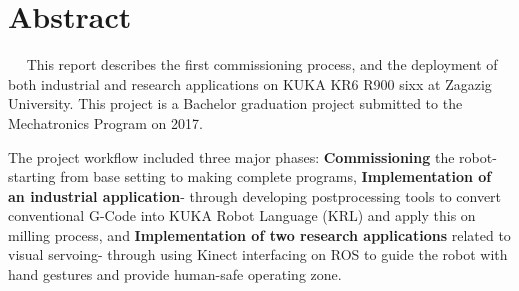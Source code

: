 \chapter*{Abstract}\label{ch:abstract}
%
%
\setlength{\parindent}{1em}
  
This report describes the first commissioning process, and the deployment of both industrial and research applications on KUKA KR6 R900 sixx at Zagazig University. This project is a Bachelor graduation project submitted to the Mechatronics Program on 2017.%

The project workflow included three major phases: \textbf{Commissioning} the robot- starting from base setting to making complete programs,  \textbf{Implementation of an industrial application}- through developing postprocessing tools to convert conventional G-Code into KUKA Robot Language (KRL) and apply this on milling process, and \textbf{ Implementation of two research applications} related to visual servoing- through using Kinect interfacing on ROS to guide the robot with hand gestures and provide human-safe operating zone.